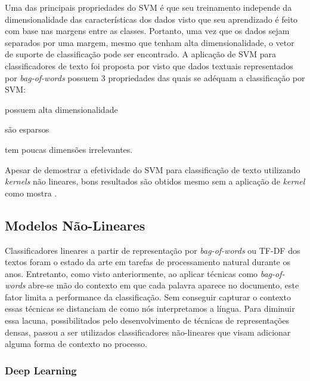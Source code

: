 Uma das principais propriedades do SVM é que seu treinamento independe da
dimensionalidade das características dos dados visto que seu aprendizado é feito
com base nas margens entre as classes.
Portanto, uma vez que os dados sejam separados por uma margem, mesmo que tenham
alta dimensionalidade, o vetor de suporte de classificação pode ser encontrado.
A aplicação de SVM para classificadores de texto foi proposta por
\citet{joachims98} visto que dados textuais representados por
\textit{bag-of-words} possuem 3 propriedades das quais se adéquam a
classificação por SVM:
\begin {enumerate*} [label=\itshape\alph*\upshape)]
    \item possuem alta dimensionalidade
    \item são esparsos
    \item tem poucas dimensões irrelevantes.
\end {enumerate*}
Apesar de \citet{joachims98} demostrar a efetividade do SVM para classificação
de texto utilizando \textit{kernels} não lineares, bons resultados são obtidos
mesmo sem a aplicação de \textit{kernel} como mostra \citet{pang02}.

\subsection{Modelos Não-Lineares}

Classificadores lineares a partir de representação por \textit{bag-of-words} ou
TF-DF dos textos foram o estado da arte em tarefas de processamento natural
durante os anos.
Entretanto, como visto anteriormente, ao aplicar técnicas como
\textit{bag-of-words} abre-se mão do contexto em que cada palavra aparece no
documento, este fator limita a performance da classificação.
Sem conseguir capturar o contexto essas técnicas se distanciam de como nós
interpretamos a língua.
Para diminuir essa lacuna, possibilitados pelo desenvolvimento de técnicas de
representações densas, passou a ser utilizados classificadores não-lineares que
visam adicionar alguma forma de contexto no processo.

\subsubsection{Deep Learning}

